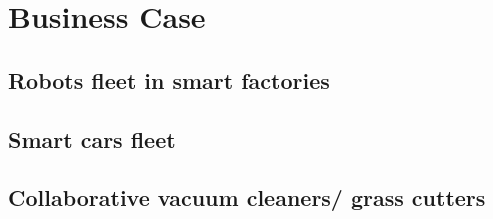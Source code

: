 \chapter{Business Case}

\section{Robots fleet in smart factories}


\section{Smart cars fleet}


\section{Collaborative vacuum cleaners/ grass cutters}
